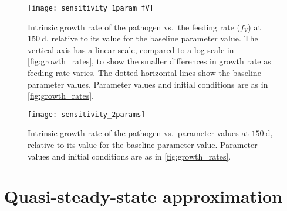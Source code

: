 \documentclass{article}
\begin{document}
\begin{figure}
  \centering
  \texttt{[image: sensitivity\_1param\_fV]}
  \caption{Intrinsic growth rate of the pathogen vs.~the feeding rate
    ($f_V$) at $150~\text{d}$, relative to its value for the baseline
    parameter value.  The vertical axis has a linear scale, compared
    to a log scale in \autoref{fig:growth_rates}, to show the smaller
    differences in growth rate as feeding rate varies.  The dotted
    horizontal lines show the baseline parameter values.  Parameter
    values and initial conditions are as in
    \autoref{fig:growth_rates}.}
  \label{fig:sensitivity_1param_fV}
\end{figure}

\begin{figure}
  \centering
  \texttt{[image: sensitivity\_2params]}
  \caption{Intrinsic growth rate of the pathogen vs.~parameter values
    at $150~\text{d}$, relative to its value for the baseline
    parameter value.  Parameter values and
    initial conditions are as in \autoref{fig:growth_rates}.}
  \label{fig:sensitivity_2params}
\end{figure}


\clearpage
\appendix
\section{Quasi-steady-state approximation}
\label{sec:QSSA}
\end{document}
